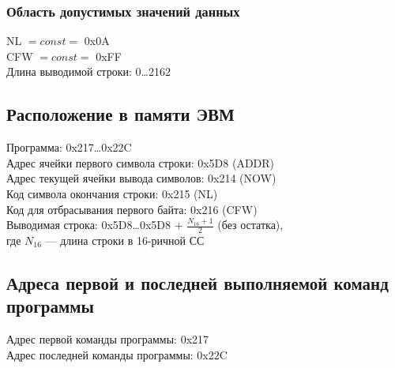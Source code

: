 \subsubsection{Область допустимых значений данных}
\noindent NL $=const=$ 0x0A\\
CFW $=const=$ 0xFF\\
Длина выводимой строки: 0\ldots2162

\subsection{Расположение в памяти ЭВМ}
\noindent Программа: 0x217\ldots0x22C\\
Адрес ячейки первого символа строки: 0x5D8 (ADDR)\\
Адрес текущей ячейки вывода символов: 0x214 (NOW)\\
Код символа окончания строки: 0x215 (NL)\\
Код для отбрасывания первого байта: 0x216 (CFW)\\
Выводимая строка: 0x5D8\ldots0x5D8 $+$ $\frac{N_{16}+1}{2}$ (без остатка),\\где $N_{16}$ --- длина строки в 16-ричной СС

\subsection{Адреса первой и последней выполняемой команд программы}
\noindent Адрес первой команды программы: 0x217\\
Адрес последней команды программы: 0x22C

